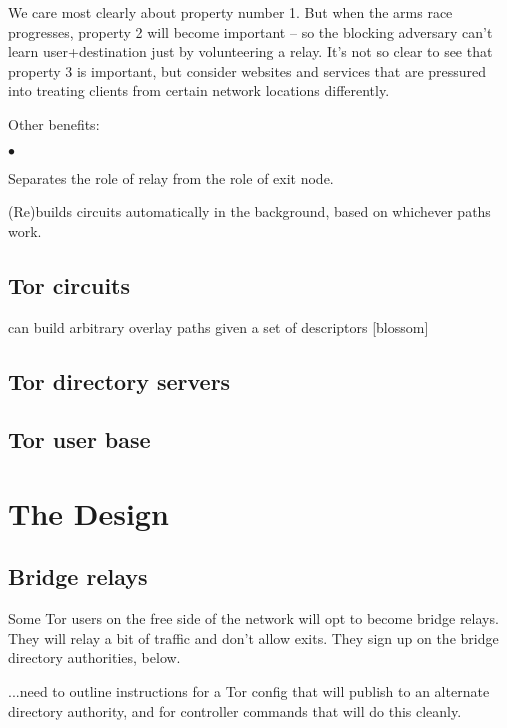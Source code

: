 \documentclass{llncs}
\newenvironment{tightlist}{\begin{list}{$\bullet$}{
  \setlength{\itemsep}{0mm}
    \setlength{\parsep}{0mm}
    }}{\end{list}}
\begin{document}
We care most clearly about property number 1. But when the arms race
progresses, property 2 will become important -- so the blocking adversary
can't learn user+destination just by volunteering a relay. It's not so
clear to see that property 3 is important, but consider websites and
services that are pressured into treating clients from certain network
locations differently.

Other benefits:

\begin{tightlist}
\item Separates the role of relay from the role of exit node.

\item (Re)builds circuits automatically in the background, based on
whichever paths work.
\end{tightlist}

\subsection{Tor circuits}

can build arbitrary overlay paths given a set of descriptors [blossom] %

\subsection{Tor directory servers}

\subsection{Tor user base}

\section{The Design}

\subsection{Bridge relays}

Some Tor users on the free side of the network will opt to become bridge
relays. They will relay a bit of traffic and don't allow exits. They
sign up on the bridge directory authorities, below.

...need to outline instructions for a Tor config that will publish
to an alternate directory authority, and for controller commands
that will do this cleanly.
\end{document}
